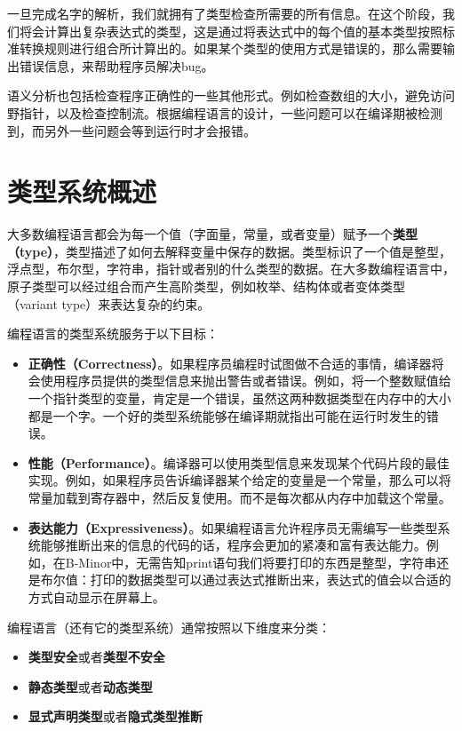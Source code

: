 \documentclass[cn,11pt,chinese]{elegantbook}
\begin{document}
一旦完成名字的解析，我们就拥有了类型检查所需要的所有信息。在这个阶段，我们将会计算出复杂表达式的类型，这是通过将表达式中的每个值的基本类型按照标准转换规则进行组合所计算出的。如果某个类型的使用方式是错误的，那么需要输出错误信息，来帮助程序员解决bug。

语义分析也包括检查程序正确性的一些其他形式。例如检查数组的大小，避免访问野指针，以及检查控制流。根据编程语言的设计，一些问题可以在编译期被检测到，而另外一些问题会等到运行时才会报错。

\section{类型系统概述}

大多数编程语言都会为每一个值（字面量，常量，或者变量）赋予一个\textbf{类型（type）}，类型描述了如何去解释变量中保存的数据。类型标识了一个值是整型，浮点型，布尔型，字符串，指针或者别的什么类型的数据。在大多数编程语言中，原子类型可以经过组合而产生高阶类型，例如枚举、结构体或者变体类型（variant type）来表达复杂的约束。

编程语言的类型系统服务于以下目标：

\begin{itemize}
  \item \textbf{正确性（Correctness）}。如果程序员编程时试图做不合适的事情，编译器将会使用程序员提供的类型信息来抛出警告或者错误。例如，将一个整数赋值给一个指针类型的变量，肯定是一个错误，虽然这两种数据类型在内存中的大小都是一个字。一个好的类型系统能够在编译期就指出可能在运行时发生的错误。
  \item \textbf{性能（Performance）}。编译器可以使用类型信息来发现某个代码片段的最佳实现。例如，如果程序员告诉编译器某个给定的变量是一个常量，那么可以将常量加载到寄存器中，然后反复使用。而不是每次都从内存中加载这个常量。
  \item \textbf{表达能力（Expressiveness）}。如果编程语言允许程序员无需编写一些类型系统能够推断出来的信息的代码的话，程序会更加的紧凑和富有表达能力。例如，在B-Minor中，无需告知print语句我们将要打印的东西是整型，字符串还是布尔值：打印的数据类型可以通过表达式推断出来，表达式的值会以合适的方式自动显示在屏幕上。
\end{itemize}

编程语言（还有它的类型系统）通常按照以下维度来分类：

\begin{itemize}
  \item \textbf{类型安全}或者\textbf{类型不安全}
  \item \textbf{静态类型}或者\textbf{动态类型}
  \item \textbf{显式声明类型}或者\textbf{隐式类型推断}
\end{itemize}
\end{document}
